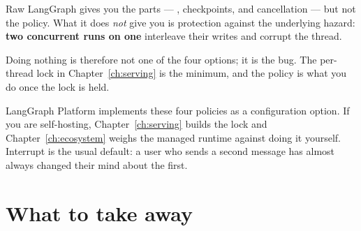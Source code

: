 \begin{warning}
Raw LangGraph gives you the parts --- , checkpoints, and
 cancellation --- but not the policy. What it does \emph{not} give
you is protection against the underlying hazard: \textbf{two concurrent runs on
one } interleave their writes and corrupt the thread.

Doing nothing is therefore not one of the four options; it is the bug. The
per-thread lock in Chapter~\ref{ch:serving} is the minimum, and the policy is
what you do once the lock is held.
\end{warning}

\begin{note}
LangGraph Platform implements these four policies as a configuration option. If
you are self-hosting, Chapter~\ref{ch:serving} builds the lock and
Chapter~\ref{ch:ecosystem} weighs the managed runtime against doing it yourself.
Interrupt is the usual default: a user who sends a second message has almost
always changed their mind about the first.
\end{note}

\section{What to take away}
\label{sec:ch10-summary}

